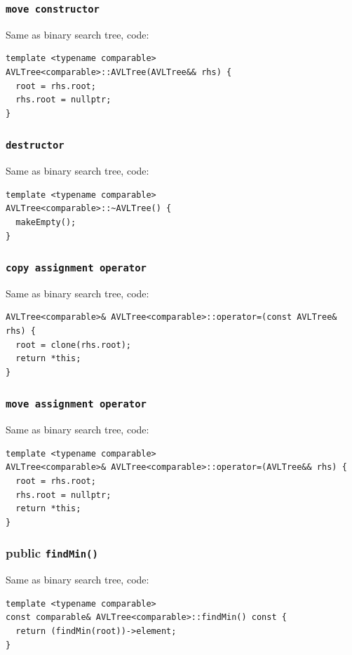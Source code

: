 \documentclass[11pt]{book}
\begin{document}
\subsubsection{\texttt{move constructor}}
\label{sec:org72400a7}
Same as binary search tree, code:
\begin{verbatim}
template <typename comparable>
AVLTree<comparable>::AVLTree(AVLTree&& rhs) {
  root = rhs.root;
  rhs.root = nullptr;
}
\end{verbatim}
\subsubsection{\texttt{destructor}}
\label{sec:orgc6fad5f}
Same as binary search tree, code:
\begin{verbatim}
template <typename comparable>
AVLTree<comparable>::~AVLTree() {
  makeEmpty();
}
\end{verbatim}
\subsubsection{\texttt{copy assignment operator}}
\label{sec:org14bc0f6}
Same as binary search tree, code:
\begin{verbatim}
AVLTree<comparable>& AVLTree<comparable>::operator=(const AVLTree& rhs) {
  root = clone(rhs.root);
  return *this;
}
\end{verbatim}
\subsubsection{\texttt{move assignment operator}}
\label{sec:org39d672b}
Same as binary search tree, code:
\begin{verbatim}
template <typename comparable>
AVLTree<comparable>& AVLTree<comparable>::operator=(AVLTree&& rhs) {
  root = rhs.root;
  rhs.root = nullptr;
  return *this;
}
\end{verbatim}
\subsubsection{public \texttt{findMin()}}
\label{sec:org23cf28e}
Same as binary search tree, code:
\begin{verbatim}
template <typename comparable>
const comparable& AVLTree<comparable>::findMin() const {
  return (findMin(root))->element;
}
\end{verbatim}
\end{document}

